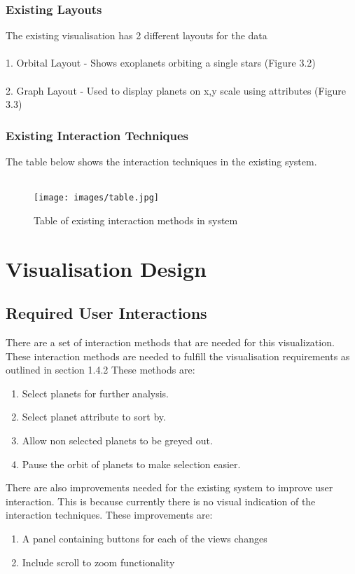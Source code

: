 \documentclass[11pt
              , a4paper
              , twoside
              , openright
              ]{report}
\begin{document}
\subsection{Existing Layouts}
The existing visualisation has 2 different layouts for the data
\\\\
1. Orbital Layout - Shows exoplanets orbiting a single stars (Figure 3.2)
\\\\
2. Graph Layout - Used to display planets on x,y scale using attributes (Figure
3.3)

\subsection{Existing Interaction Techniques}
 The table below shows the interaction techniques in the existing system.
\\\\
\begin{figure}[h]
  \centering
      \texttt{[image: images/table.jpg]}
  \caption{Table of existing interaction methods in system}
\end{figure}

\chapter{Visualisation Design}
\section{Required User Interactions}
There are a set of interaction methods that are needed for this visualization.
These interaction methods are needed to fulfill the visualisation requirements
as outlined in section 1.4.2 These methods are:
\begin{enumerate}
 \item Select planets for further analysis.
 \item Select planet attribute to sort by.
 \item Allow non selected planets to be greyed out.
 \item Pause the orbit of planets to make selection easier.

\end{enumerate}
There are also improvements needed for the existing system to improve user
interaction. This is because currently there is no visual indication of the
interaction techniques. These improvements are:
\begin{enumerate}
 \item A panel containing buttons for each of the views changes
 \item Include scroll to zoom functionality
\end{enumerate}
\end{document}
